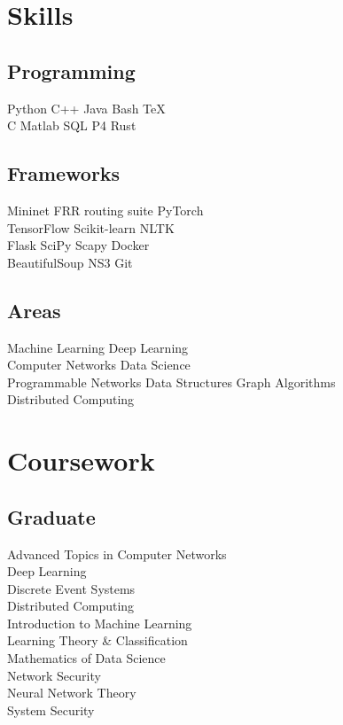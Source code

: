 \documentclass[]{onepage}
\begin{document}
\begin{minipage}[t]{0.33\textwidth}
\section{Skills}
\subsection{Programming}
\textbullet{} Python \textbullet{} C++ \textbullet{} Java \textbullet{} Bash \textbullet{} \TeX\  \\ 
\textbullet{} C \textbullet{} Matlab \textbullet{} SQL \textbullet{} P4 \textbullet{} Rust \\ 
\vspace{0.1cm}
\subsection{Frameworks}
\textbullet{} Mininet \textbullet{} FRR routing suite \textbullet{} PyTorch \\ \textbullet{} TensorFlow \textbullet{}Scikit-learn \textbullet{} NLTK \\ \textbullet{} Flask \textbullet{} SciPy \textbullet{} Scapy \textbullet{} Docker\\ \textbullet{} BeautifulSoup \textbullet{} NS3 \textbullet{} Git
\vspace{0.1cm}
\subsection{Areas}
\textbullet{} Machine Learning \textbullet{} Deep Learning \\ \textbullet{} Computer Networks \textbullet{} Data Science \\ \textbullet{} Programmable Networks \textbullet{} Data Structures \textbullet{} Graph Algorithms\\ \textbullet{} Distributed Computing \\ 


\section{Coursework}
\subsection{Graduate}
Advanced Topics in Computer Networks \\
Deep Learning \\
Discrete Event Systems \\
Distributed Computing \\
Introduction to Machine Learning \\
Learning Theory \& Classification \\
Mathematics of Data Science \\
Network Security \\
Neural Network Theory \\
System Security \\
\vspace{0.1cm}

\end{minipage}
\end{document}
